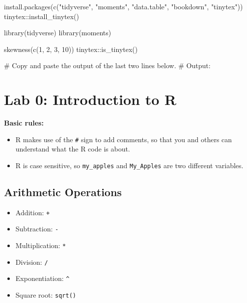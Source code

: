 \documentclass[
  12pt,
  a4paper,
]{scrbook}
\newenvironment{Shaded}{\begin{snugshade}}{\end{snugshade}}
\newcommand{\CommentTok}[1]{\textcolor[rgb]{0.37,0.37,0.37}{#1}}
\newcommand{\DecValTok}[1]{\textcolor[rgb]{0.68,0.00,0.00}{#1}}
\newcommand{\FunctionTok}[1]{\textcolor[rgb]{0.28,0.35,0.67}{#1}}
\newcommand{\NormalTok}[1]{\textcolor[rgb]{0.00,0.23,0.31}{#1}}
\newcommand{\SpecialCharTok}[1]{\textcolor[rgb]{0.37,0.37,0.37}{#1}}
\newcommand{\StringTok}[1]{\textcolor[rgb]{0.13,0.47,0.30}{#1}}
\providecommand{\tightlist}{%
  \setlength{\itemsep}{0pt}\setlength{\parskip}{0pt}}
\renewcommand{\tightlist}{\setlength{\itemsep}{0.5\baselineskip}\setlength{\parskip}{0.2\baselineskip}}
\theoremstyle{plain}
\theoremstyle{definition}
\theoremstyle{remark}
\begin{document}
\begin{Shaded}
\begin{Highlighting}[]
\FunctionTok{install.packages}\NormalTok{(}\FunctionTok{c}\NormalTok{(}\StringTok{"tidyverse"}\NormalTok{, }\StringTok{"moments"}\NormalTok{, }\StringTok{"data.table"}\NormalTok{, }\StringTok{"bookdown"}\NormalTok{, }\StringTok{"tinytex"}\NormalTok{))}
\NormalTok{tinytex}\SpecialCharTok{::}\FunctionTok{install\_tinytex}\NormalTok{()}

\FunctionTok{library}\NormalTok{(tidyverse)}
\FunctionTok{library}\NormalTok{(moments)}

\FunctionTok{skewness}\NormalTok{(}\FunctionTok{c}\NormalTok{(}\DecValTok{1}\NormalTok{, }\DecValTok{2}\NormalTok{, }\DecValTok{3}\NormalTok{, }\DecValTok{10}\NormalTok{))}
\NormalTok{tinytex}\SpecialCharTok{::}\FunctionTok{is\_tinytex}\NormalTok{()}


\CommentTok{\# Copy and paste the output of the last two lines below.}
\CommentTok{\# Output:}
\end{Highlighting}
\end{Shaded}

\chapter{Lab 0: Introduction to R}\label{lab-0-introduction-to-r}

\textbf{Basic rules:}

\begin{itemize}
\tightlist
\item
  R makes use of the \texttt{\#} sign to add comments, so that you and
  others can understand what the R code is about.
\item
  R is case sensitive, so \texttt{my\_apples} and \texttt{My\_Apples}
  are two different variables.
\end{itemize}

\section{Arithmetic Operations}\label{arithmetic-operations}

\begin{itemize}
\tightlist
\item
  Addition: \texttt{+}
\item
  Subtraction: \texttt{-}
\item
  Multiplication: \texttt{*}
\item
  Division: \texttt{/}
\item
  Exponentiation: \texttt{\^{}}
\item
  Square root: \texttt{sqrt()}
\end{itemize}
\end{document}
